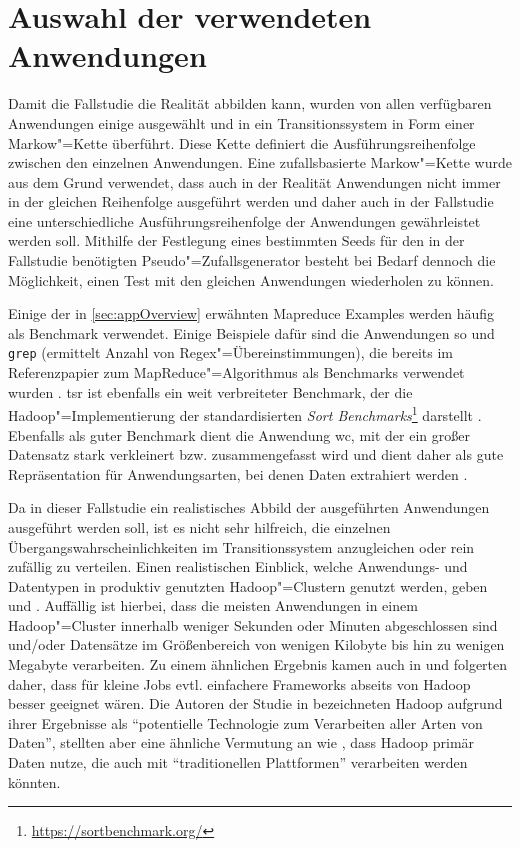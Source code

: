 \section{Auswahl der verwendeten Anwendungen}
\label{sec:appSelection}

Damit die Fallstudie die Realität abbilden kann, wurden von allen verfügbaren Anwendungen einige ausgewählt und in ein Transitionssystem in Form einer Markow"=Kette überführt.
Diese Kette definiert die Ausführungsreihenfolge zwischen den einzelnen Anwendungen.
Eine zufallsbasierte Markow"=Kette wurde aus dem Grund verwendet, dass auch in der Realität Anwendungen nicht immer in der gleichen Reihenfolge ausgeführt werden und daher auch in der Fallstudie eine unterschiedliche Ausführungsreihenfolge der Anwendungen gewährleistet werden soll.
Mithilfe der Festlegung eines bestimmten Seeds für den in der Fallstudie benötigten Pseudo"=Zufallsgenerator besteht bei Bedarf dennoch die Möglichkeit, einen Test mit den gleichen Anwendungen wiederholen zu können.

Einige der in \autoref{sec:appOverview} erwähnten Mapreduce Examples werden häufig als Benchmark verwendet.
Einige Beispiele dafür sind die Anwendungen \acl{so} und \texttt{grep} (ermittelt Anzahl von Regex"=Übereinstimmungen), die bereits im Referenzpapier zum MapReduce"=Algorithmus als Benchmarks verwendet wurden \cite{Dean2008}.
\acl{tsr} ist ebenfalls ein weit verbreiteter Benchmark, der die Hadoop"=Implementierung der standardisierten \emph{Sort Benchmarks}\footnote{\url{https://sortbenchmark.org/}} darstellt \cite{Graves2013}.
Ebenfalls als guter Benchmark dient die Anwendung \acl{wc}, mit der ein großer Datensatz stark verkleinert bzw. zusammengefasst wird und dient daher als gute Repräsentation für Anwendungsarten, bei denen Daten extrahiert werden \cite{Huang2010,Chen2012}.

Da in dieser Fallstudie ein realistisches Abbild der ausgeführten Anwendungen ausgeführt werden soll, ist es nicht sehr hilfreich, die einzelnen Übergangswahrscheinlichkeiten im Transitionssystem anzugleichen oder rein zufällig zu verteilen.
Einen realistischen Einblick, welche Anwendungs- und Datentypen in produktiv genutzten Hadoop"=Clustern genutzt werden, geben \uA \cite{Chen2012} und \cite{HadoopDataTypes}.
Auffällig ist hierbei, dass die meisten Anwendungen in einem Hadoop"=Cluster innerhalb weniger Sekunden oder Minuten abgeschlossen sind und/oder Datensätze im Größenbereich von wenigen Kilobyte bis hin zu wenigen Megabyte verarbeiten.
Zu einem ähnlichen Ergebnis kamen auch \citeauthor{Ren2013} in \cite{Ren2013} und folgerten daher, dass für kleine Jobs evtl. einfachere Frameworks abseits von Hadoop besser geeignet wären.
Die Autoren der Studie in \cite{HadoopDataTypes} bezeichneten Hadoop aufgrund ihrer Ergebnisse als \enquote{potentielle Technologie zum Verarbeiten aller Arten von Daten}, stellten aber eine ähnliche Vermutung an wie \citeauthor{Ren2013}, dass Hadoop primär Daten nutze, die auch mit \enquote{traditionellen Plattformen} verarbeiten werden könnten.

